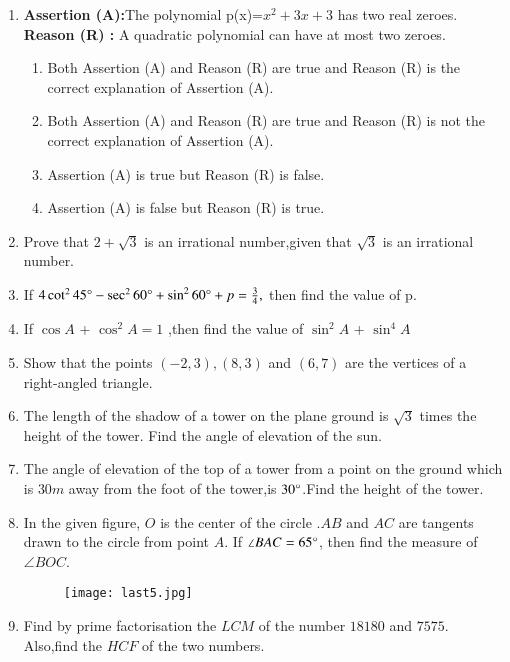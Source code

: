 \documentclass[12pt,-letter paper]{article}
\providecommand{\brak}[1]{\ensuremath{\left(#1\right)}}
\begin{document}
\begin{enumerate}
   
	\item \textbf{Assertion (A):}The polynomial p(x)=$x^{2}+3x+3$ has two real zeroes.
		\textbf{Reason (R) :} A quadratic polynomial can have at most two zeroes.
\begin{enumerate}
\item Both Assertion (A) and Reason (R) are true and Reason (R) is the correct explanation of Assertion (A). 
\item Both Assertion (A) and Reason (R) are true and Reason (R) is not the correct explanation of Assertion (A).
\item Assertion (A) is true but Reason (R) is false.
\item Assertion (A) is false but Reason (R) is true.
\end{enumerate}

\item Prove that $ 2+\sqrt3 $ is an irrational number,given that $ \sqrt3 $ is an irrational number.

\item If $4 \cot^{2}45\degree-\sec^{2}60\degree+\sin^{2}60\degree+p=\frac{3}{4},$ then find the value of p.

\item If $\cos A$ + $\cos^{2}A = 1$ ,then find the value of $\sin^{2}A$ + $\sin^{4}A$

\item Show that the points $\brak{-2,3}, \brak{8,3}$ and $\brak{6,7} $ are the vertices of a right-angled triangle.
\item The length of the shadow of a tower on the plane ground is $ \sqrt3 $ times the height of the tower. Find the angle of elevation of the sun.

\item The angle of elevation of the top of a tower from a point on the ground which is $30 m$ away from the foot of the tower,is $30\degree$.Find the height of the tower.

\item In the given figure, $O$ is the center of the circle .$AB$ and $AC$ are tangents drawn to the circle from point $A$. If $\angle BAC = 65\degree $, then find the measure of $\angle BOC $.
	\begin{figure}[!ht]
		\centering
		\texttt{[image: last5.jpg]}
		\caption{}
		\label{fig:enter-label}
	\end{figure}
\newpage
\item Find by prime factorisation the $LCM$ of the number $18180$ and $7575$. Also,find the $HCF$ of the two numbers.


\end{enumerate}
\end{document}
